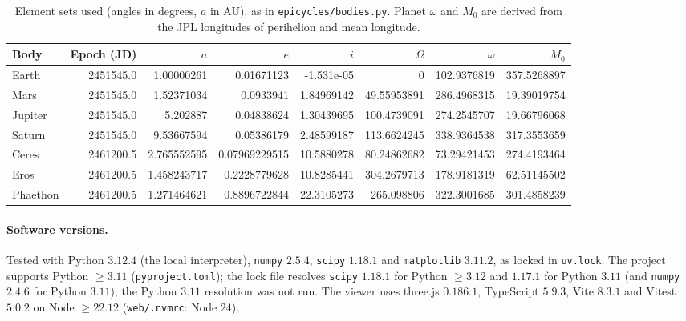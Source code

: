 \begin{table}[tb]
\caption{Element sets used (angles in degrees, $a$ in AU), as in
\texttt{epicycles/bodies.py}. Planet $\omega$ and $M_0$ are derived from the JPL
longitudes of perihelion and mean longitude.}
\label{tab:elements}
\begin{ruledtabular}
\begin{tabular}{lrrrrrrr}
Body & Epoch (JD) & $a$ & $e$ & $i$ & $\Omega$ & $\omega$ & $M_0$\\
\hline
Earth & 2451545.0 & 1.00000261 & 0.01671123 & -1.531e-05 & 0 & 102.9376819 & 357.5268897 \\
Mars & 2451545.0 & 1.52371034 & 0.0933941 & 1.84969142 & 49.55953891 & 286.4968315 & 19.39019754 \\
Jupiter & 2451545.0 & 5.202887 & 0.04838624 & 1.30439695 & 100.4739091 & 274.2545707 & 19.66796068 \\
Saturn & 2451545.0 & 9.53667594 & 0.05386179 & 2.48599187 & 113.6624245 & 338.9364538 & 317.3553659 \\
Ceres & 2461200.5 & 2.765552595 & 0.07969229515 & 10.5880278 & 80.24862682 & 73.29421453 & 274.4193464 \\
Eros & 2461200.5 & 1.458243717 & 0.2228779628 & 10.8285441 & 304.2679713 & 178.9181319 & 62.51145502 \\
Phaethon & 2461200.5 & 1.271464621 & 0.8896722844 & 22.3105273 & 265.098806 & 322.3001685 & 301.4858239 \\
\end{tabular}
\end{ruledtabular}
\end{table}

\paragraph*{Software versions.}
Tested with Python $3.12.4$ (the local interpreter), \texttt{numpy} $2.5.4$, \texttt{scipy} $1.18.1$ and
\texttt{matplotlib} $3.11.2$, as locked in \texttt{uv.lock}. The project supports Python $\ge3.11$
(\texttt{pyproject.toml}); the lock file resolves \texttt{scipy} $1.18.1$ for Python $\ge3.12$ and
$1.17.1$ for Python $3.11$ (and \texttt{numpy} $2.4.6$ for Python $3.11$); the Python $3.11$ resolution was not run. The viewer
uses three.js $0.186.1$, TypeScript $5.9.3$, Vite $8.3.1$ and Vitest $5.0.2$ on
Node $\ge22.12$ (\texttt{web/.nvmrc}: Node $24$).

